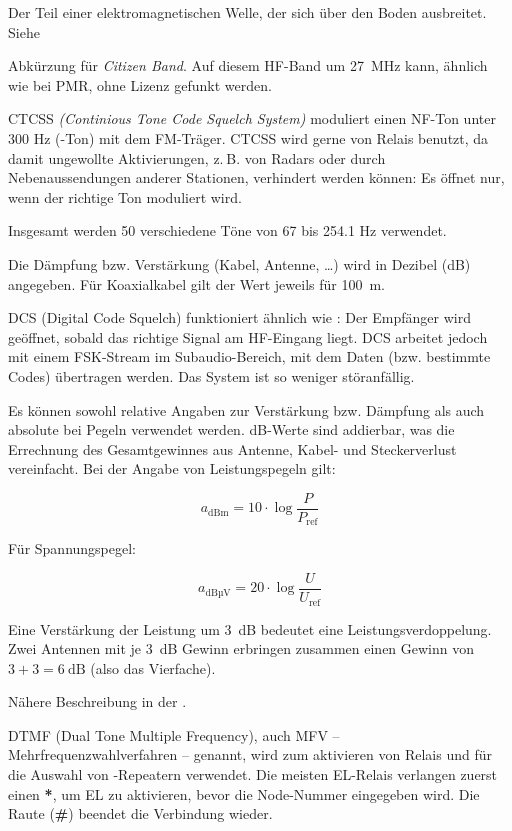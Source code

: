 {Der Teil einer elektromagnetischen Welle, der sich über den Boden ausbreitet. Siehe }

{Abkürzung für \textit{Citizen Band}. Auf diesem HF-Band um 27 MHz kann, ähnlich wie bei PMR, ohne Lizenz gefunkt werden.}

{CTCSS \textit{(Continious Tone Code Squelch System)} moduliert einen NF-Ton unter 300 Hz (-Ton) mit dem FM-Träger. CTCSS wird gerne von Relais benutzt, da damit ungewollte Aktivierungen, z. B. von Radars oder durch Nebenaussendungen anderer Stationen, verhindert werden können: Es öffnet nur, wenn der richtige Ton moduliert wird.

Insgesamt werden 50 verschiedene Töne von 67 bis 254.1 Hz verwendet.}

{Die Dämpfung bzw. Verstärkung (Kabel, Antenne, …) wird in Dezibel (dB) angegeben. Für Koaxialkabel gilt der Wert jeweils für 100 m.}

{DCS (Digital Code Squelch) funktioniert ähnlich wie : Der Empfänger wird geöffnet, sobald das richtige Signal am HF-Eingang liegt. DCS arbeitet jedoch mit einem FSK-Stream im Subaudio-Bereich, mit dem Daten (bzw. bestimmte Codes) übertragen werden. Das System ist so weniger störanfällig.}

{Es können sowohl relative Angaben zur Verstärkung bzw. Dämpfung als auch absolute bei Pegeln verwendet werden. dB-Werte sind addierbar, was die Errechnung des Gesamtgewinnes aus Antenne, Kabel- und Steckerverlust vereinfacht.
Bei der Angabe von Leistungspegeln gilt:

\[ a_\mathrm{dBm} = 10 \cdot \log \frac{P}{P_\mathrm{ref}} \]

Für Spannungspegel:

\[ a_\mathrm{dBµV} = 20 \cdot \log \frac{U}{U_\mathrm{ref}} \]

Eine Verstärkung der Leistung um 3 dB bedeutet eine Leistungsverdoppelung. Zwei Antennen mit je 3 dB Gewinn erbringen zusammen einen Gewinn von $3 + 3 = 6~\mathrm{dB}$ (also das Vierfache).

Nähere Beschreibung in der .}

{DTMF (Dual Tone Multiple Frequency), auch MFV – Mehrfrequenzwahlverfahren – genannt, wird zum aktivieren von Relais und für die Auswahl von -Repeatern verwendet. Die meisten EL-Relais verlangen zuerst einen \textbf{*}, um EL zu aktivieren, bevor die Node-Nummer eingegeben wird. Die Raute (\textbf{\#}) beendet die Verbindung wieder.}


